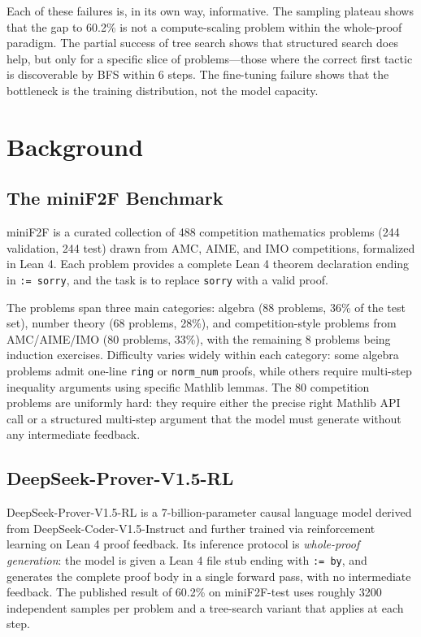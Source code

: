 \documentclass[openany, amssymb, psamsfonts]{amsart}
\theoremstyle{definition}
\numberwithin{equation}{section}
\begin{document}
Each of these failures is, in its own way, informative.
The sampling plateau shows that the gap to 60.2\% is not a compute-scaling
problem within the whole-proof paradigm.
The partial success of tree search shows that structured search does help,
but only for a specific slice of problems---those where the correct first
tactic is discoverable by BFS within 6 steps.
The fine-tuning failure shows that the bottleneck is the training
distribution, not the model capacity.

\section{Background}

\subsection{The miniF2F Benchmark}

miniF2F \cite{minif2f} is a curated collection of 488 competition mathematics
problems (244 validation, 244 test) drawn from AMC, AIME, and IMO competitions,
formalized in Lean 4.
Each problem provides a complete Lean 4 theorem declaration ending in
\texttt{:= sorry}, and the task is to replace \texttt{sorry} with a valid proof.

The problems span three main categories: algebra (88 problems, 36\% of the
test set), number theory (68 problems, 28\%), and competition-style problems
from AMC/AIME/IMO (80 problems, 33\%), with the remaining 8 problems being
induction exercises.
Difficulty varies widely within each category: some algebra problems admit
one-line \texttt{ring} or \texttt{norm\_num} proofs, while others require
multi-step inequality arguments using specific Mathlib lemmas.
The 80 competition problems are uniformly hard: they require either the precise
right Mathlib API call or a structured multi-step argument that the model must
generate without any intermediate feedback.

\subsection{DeepSeek-Prover-V1.5-RL}

DeepSeek-Prover-V1.5-RL \cite{deepseek} is a 7-billion-parameter causal language
model derived from DeepSeek-Coder-V1.5-Instruct and further trained via reinforcement
learning on Lean 4 proof feedback.
Its inference protocol is \emph{whole-proof generation}: the model is given a
Lean 4 file stub ending with \texttt{:= by}, and generates the complete proof body
in a single forward pass, with no intermediate feedback.
The published result of 60.2\% on miniF2F-test uses roughly 3200 independent
samples per problem and a tree-search variant that applies at each step.
\end{document}
